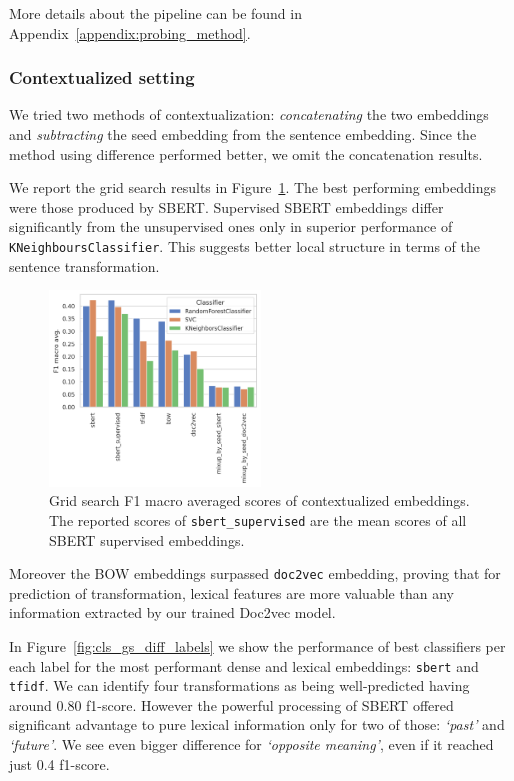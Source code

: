 \documentclass[11pt]{article}
\newcommand{\Embed}[1]{\texttt{#1}}
\newcommand{\Cls}[1]{\texttt{#1}}
\newcommand{\Trans}[1]{\textsl{`#1'}}
\begin{document}
More details about the pipeline can be found in
Appendix~\ref{appendix:probing_method}.

\subsubsection{Contextualized setting}

We tried two methods of contextualization: \emph{concatenating} the two
embeddings and \emph{subtracting} the seed embedding from the sentence
embedding. Since the method using difference performed better, we omit the
concatenation results.

We report the grid search results in
Figure~\ref{fig:cls_gs_diff_embed_comparison}. The best performing embeddings
were those produced by SBERT\@. Supervised SBERT embeddings differ
significantly from the unsupervised ones only in superior performance of
\Cls{KNeighboursClassifier}. This suggests better local structure in terms of
the sentence transformation.

\begin{figure}[htp]
  \centering
  \includegraphics[width=0.5\textwidth]{figs/cls_gs_diff_embed_comparison.png}

  \caption{Grid search F1 macro averaged scores of contextualized embeddings.
  The reported scores of \Embed{sbert\_supervised} are the mean scores of all
  SBERT supervised embeddings.
  }\label{fig:cls_gs_diff_embed_comparison}

\end{figure}

Moreover the BOW embeddings surpassed \Embed{doc2vec} embedding,
proving that for prediction of transformation, lexical features are more
valuable than any information extracted by our trained Doc2vec model.


In Figure~\ref{fig:cls_gs_diff_labels} we show the performance of best
classifiers per each label for the most performant dense and lexical
embeddings: \Embed{sbert} and \Embed{tfidf}. We can identify four
transformations as being well-predicted having around 0.80 f1-score. However
the powerful processing of SBERT offered significant advantage to pure lexical
information only for two of those: \Trans{past} and \Trans{future}. We see even
bigger difference for \Trans{opposite meaning}, even if it reached just 0.4
f1-score.
\end{document}
